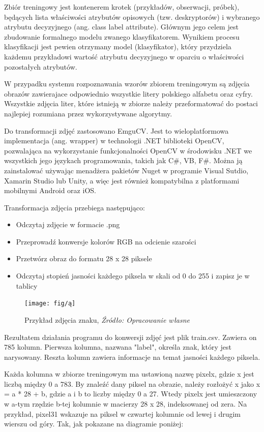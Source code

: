 \documentclass[brudnopis]{xmgr}
\begin{document}
Zbiór treningowy\cite{19} jest kontenerem krotek (przykładów, obserwacji, próbek), będących lista właściwości atrybutów opisowych (tzw. deskryptorów) i wybranego atrybutu decyzyjnego (ang. class label attribute). Głównym jego celem jest zbudowanie formalnego modelu zwanego klasyfikatorem. Wynikiem procesu klasyfikacji jest pewien otrzymany model (klasyfikator), który przydziela każdemu przykładowi wartość atrybutu decyzyjnego w oparciu o właściwości pozostałych atrybutów.

W przypadku systemu rozpoznawania wzorów zbiorem treningowym są zdjęcia obrazów zawierajace odpowiednio wszystkie litery polskiego alfabetu oraz cyfry. Wszystkie zdjęcia liter, które istnieją w zbiorze należy przeformatować do postaci najlepiej rozumiana przez wykorzystywane algorytmy.

Do transformacji zdjęć zastosowano EmguCV\cite{18}. Jest to wieloplatformowa implementacja (ang. wrapper) w technologii .NET biblioteki OpenCV, pozwalająca na wykorzystanie funkcjonalności OpenCV\cite{21} w środowisku .NET we wszystkich jego językach programowania, takich jak C\#, VB, F\#\cite{1}. Można ją zainstalować używając menadżera pakietów Nuget w programie Visual Sutdio, Xamarin Studio lub Unity, a więc jest również kompatybilna z platformami mobilnymi Android oraz iOS.

Transformacja zdjęcia przebiega następująco:
\begin{itemize}
\item
Odczytaj zdjęcie w formacie .png
\item
Przeprowadź konwersje kolorów RGB na odcienie szarości
\item
Przetwórz obraz do formatu 28 x 28 piksele
\item
Odczytaj stopień jasności każdego piksela w skali od 0 do 255 i zapisz je w tablicy
\end{itemize}

\begin{figure}[!tbh]
\centering
\texttt{[image: fig/ą]}
\caption{Przykład zdjęcia znaku, \emph{Źródło: Opracowanie własne}}
\end{figure}
Rezultatem działania programu do konwersji zdjęć jest plik train.csv. Zawiera on 785 kolumn. Pierwsza kolumna, nazwana "label", określa znak, który jest narysowany. Reszta kolumn zawiera informacje na temat jasności każdego piksela.

Każda kolumna w zbiorze treningowym ma ustawioną nazwę pixelx, gdzie x jest liczbą między 0 a 783. By znaleźć dany piksel na obrazie, należy rozłożyć x jako x = a * 28 + b, gdzie a i b to liczby między 0 a 27. Wtedy pixelx jest umieszczony w a-tym rzędzie b-tej kolumnie w macierzy 28 x 28, indeksowanej od zera. Na przykład, pixel31 wskazuje na piksel w czwartej kolumnie od lewej i drugim wierszu od góry. Tak, jak pokazane na diagramie poniżej:
\end{document}
